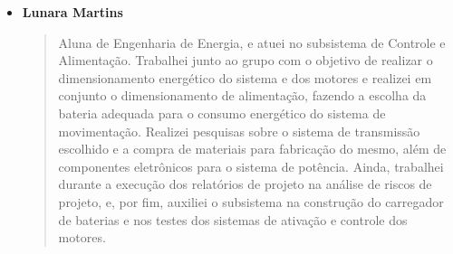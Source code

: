 \begin{itemize}
    \item \textbf{Lunara Martins}
    \begin{quote}
      Aluna de Engenharia de Energia, e atuei no subsistema de 
      Controle e Alimentação. Trabalhei junto ao grupo com o objetivo de 
      realizar o dimensionamento energético do sistema e dos motores e 
      realizei em conjunto o dimensionamento de alimentação, fazendo a escolha 
      da bateria adequada para o consumo energético do sistema de movimentação. 
      Realizei pesquisas sobre o sistema de transmissão escolhido e a compra de 
      materiais para fabricação do mesmo, além de componentes eletrônicos para o 
      sistema de potência. Ainda, trabalhei durante a execução dos relatórios de 
      projeto na análise de riscos de projeto, e, por fim, auxiliei o subsistema 
      na construção do carregador de baterias e nos testes dos sistemas de 
      ativação e controle dos motores.
    \end{quote}
\end{itemize}
